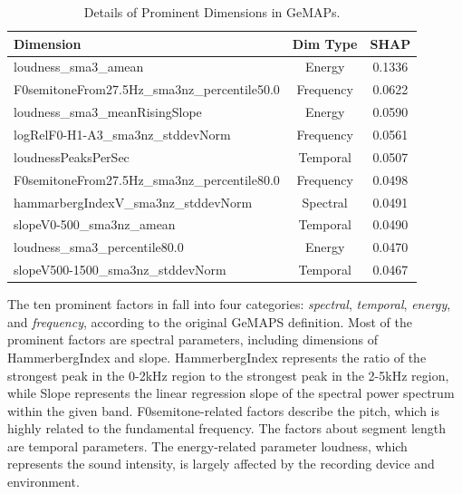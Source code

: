 \begin{table}[th]
	\scriptsize
	\centering
	\begin{tabular}{l|c|c}
		\toprule
		Dimension & Dim Type & SHAP  \\
		\midrule
		loudness\_sma3\_amean & Energy &  0.1336     \\
		F0semitoneFrom27.5Hz\_sma3nz\_percentile50.0 & Frequency &  0.0622  \\
		loudness\_sma3\_meanRisingSlope & Energy &  0.0590  \\
		logRelF0-H1-A3\_sma3nz\_stddevNorm  & Frequency & 0.0561  \\
		loudnessPeaksPerSec& Temporal  & 0.0507 \\
		F0semitoneFrom27.5Hz\_sma3nz\_percentile80.0 & Frequency  & 0.0498  \\
		hammarbergIndexV\_sma3nz\_stddevNorm & Spectral & 0.0491 \\
		slopeV0-500\_sma3nz\_amean & Temporal & 0.0490 \\
		loudness\_sma3\_percentile80.0& Energy & 0.0470  \\
		slopeV500-1500\_sma3nz\_stddevNorm& Temporal  & 0.0467\\
		\bottomrule
	\end{tabular}
	\caption{Details of Prominent Dimensions in GeMAPs. }
	\label{table:prominentfactor}
\end{table}
The ten prominent factors in  fall into four categories: 
\textit{spectral}, \textit{temporal}, \textit{energy}, and \textit{frequency}, 
according to the original GeMAPS definition. Most of the prominent factors are
spectral parameters, including dimensions of HammerbergIndex and slope. 
HammerbergIndex represents the ratio of the strongest peak in the 0-2kHz region to 
the strongest peak in the 2-5kHz region, while Slope represents the linear regression slope 
of the spectral power spectrum within the given band. F0semitone-related factors describe the pitch, which is highly related to the
fundamental frequency. The factors about segment length are temporal parameters. 
The energy-related parameter loudness, which represents the sound intensity, 
is largely affected by the recording device and environment. 

